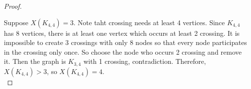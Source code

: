 \begin{proof}
\begin{center}
		\end{center}
		Suppose $X(K_{4,4}) = 3$. Note taht crossing needs at least 4 vertices. Since $K_{4,4}$ has 8 vertices, there is at least one vertex which occurs at least 2 crossing. It is impossible to create 3 crossings with only 8 nodes so that every node participates in the crossing only once. So choose the node who occurs 2 crossing and remove it. Then the graph is $K_{3,4}$ with 1 crossing, contradiction. Therefore, $X(K_{4,4}) > 3$, so $X(K_{4,4}) = 4$.\\
	\end{proof}